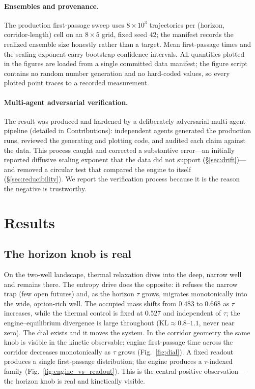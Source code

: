 \documentclass[11pt]{article}
\begin{document}
\paragraph{Ensembles and provenance.}
The production first-passage sweep uses $8\times10^3$ trajectories per (horizon, corridor-length) cell on an $8\times5$ grid, fixed seed $42$; the manifest records the realized ensemble size honestly rather than a target. Mean first-passage times and the scaling exponent carry bootstrap confidence intervals. All quantities plotted in the figures are loaded from a single committed data manifest; the figure script contains no random number generation and no hard-coded values, so every plotted point traces to a recorded measurement.

\paragraph{Multi-agent adversarial verification.}
The result was produced and hardened by a deliberately adversarial multi-agent pipeline (detailed in Contributions): independent agents generated the production runs, reviewed the generating and plotting code, and audited each claim against the data. This process caught and corrected a substantive error---an initially reported diffusive scaling exponent that the data did not support (\S\ref{sec:drift})---and removed a circular test that compared the engine to itself (\S\ref{sec:reducibility}). We report the verification process because it is the reason the negative is trustworthy.

\section{Results}

\subsection{The horizon knob is real}
\label{sec:knob}
On the two-well landscape, thermal relaxation dives into the deep, narrow well and remains there. The entropy drive does the opposite: it refuses the narrow trap (few open futures) and, as the horizon $\tau$ grows, migrates monotonically into the wide, option-rich well. The occupied mass shifts from $0.483$ to $0.668$ as $\tau$ increases, while the thermal control is fixed at $0.527$ and independent of $\tau$; the engine--equilibrium divergence is large throughout ($\mathrm{KL}\approx 0.8$--$1.1$, never near zero). The dial exists and it moves the system. In the corridor geometry the same knob is visible in the kinetic observable: engine first-passage time across the corridor decreases monotonically as $\tau$ grows (Fig.~\ref{fig:dial}). A fixed readout produces a single first-passage distribution; the engine produces a $\tau$-indexed family (Fig.~\ref{fig:engine_vs_readout}). This is the central positive observation---the horizon knob is real and kinetically visible.
\end{document}
